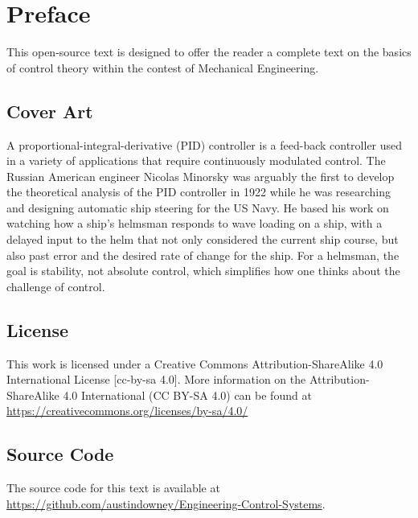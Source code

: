 \documentclass[12pt,letter]{article}
\begin{document}
\section*{Preface}

This open-source text is designed to offer the reader a complete text on the basics of control theory within the contest of Mechanical Engineering. 


\subsection*{Cover Art}
A proportional-integral-derivative (PID) controller is a feed-back controller used in a variety of applications that require continuously modulated control. The Russian American engineer Nicolas Minorsky was arguably the first to develop the theoretical analysis of the PID controller in 1922  while he was researching and designing automatic ship steering for the US Navy. He based his work on watching how a ship's helmsman responds to wave loading on a ship, with a delayed input to the helm that not only considered the current ship course, but also past error and the desired rate of change for the ship. For a helmsman, the goal is stability, not absolute control, which simplifies how one thinks about the challenge of control.

\subsection*{License}
This work is licensed under a Creative Commons Attribution-ShareAlike 4.0 International License [cc-by-sa 4.0]. More information on the Attribution-ShareAlike 4.0 International (CC BY-SA 4.0) can be found at  \url{https://creativecommons.org/licenses/by-sa/4.0/}

\subsection*{Source Code}
The source code for this text is available at \url{https://github.com/austindowney/Engineering-Control-Systems}.


\pagebreak

\tableofcontents

\pagebreak

\graphicspath{{Chapter_1_Basic_Concepts/}}



\end{document}
